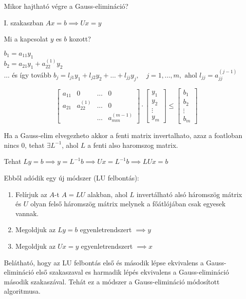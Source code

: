 \begin{kerdes}
    Mikor hajtható végre a Gauss-elimináció?
\end{kerdes}
I. szakaszban $Ax = b \implies Ux = y$

\begin{kerdes}
    Mi a kapcsolat $y$ es $b$ kozott?
\end{kerdes}
$b_{1} = a_{11}y_{1}$ \\
$b_{2} = a_{21}y_{1} + a_{22}^{(1)}y_{2}$ \\
$\dots$
és így tovább
$b_{j} = l_{j 1}y_{1} + l_{j 2}y_{2} + \dots + l_{j j }y_{j}, \quad j = 1, \dots, m, \text{ ahol } l_{jj} = a_{jj}^{(j-1)}$

$$
\begin{bmatrix}
a_{11} & 0 & \dots & 0 \\
a_{21} & a_{22}^{(1)} & \dots & 0 \\
& & \dots & a_{mm}^{(m-1)}
\end{bmatrix}
\cdot
\begin{bmatrix}
y_{1} \\
y_{2} \\
\vdots \\
y_{m}
\end{bmatrix}
\leq
\begin{bmatrix}
b_{1} \\
b_{2} \\
\vdots \\
b_{m}
\end{bmatrix}
$$

Ha a Gauss-elim elvegezheto akkor a fenti matrix invertalhato, azaz a foatloban nincs $0$, tehat $\exists L^{-1}$, ahol $L$ a fenti also haromszog matrix.

Tehat $Ly = b \implies y = L^{-1}b \implies Ux = L^{-1}b \implies LU x = b$

Ebből adódik egy új módszer (LU felbontás):
\begin{enumerate}
    \item Felírjuk az $A$-t $A = LU$ alakban, ahol $L$ invertálható alsó háromszög mátrix és $U$ olyan felső háromszög mátrix melynek a főátlójában csak egyesek vannak.
    \item Megoldjuk az $Ly = b$ egyenletrendszert $\implies y$
    \item Megoldjuk az $Ux = y$ egyenletrendszert $\implies x$
\end{enumerate}

Belátható, hogy az LU felbontás első és második lépse ekvivalens a Gauss-elimináció első szakaszaval es harmadik lépés ekvivalens a Gauss-elimináció második szakaszával. Tehát ez a módszer a Gauss-elimináció módosított algoritmusa.

